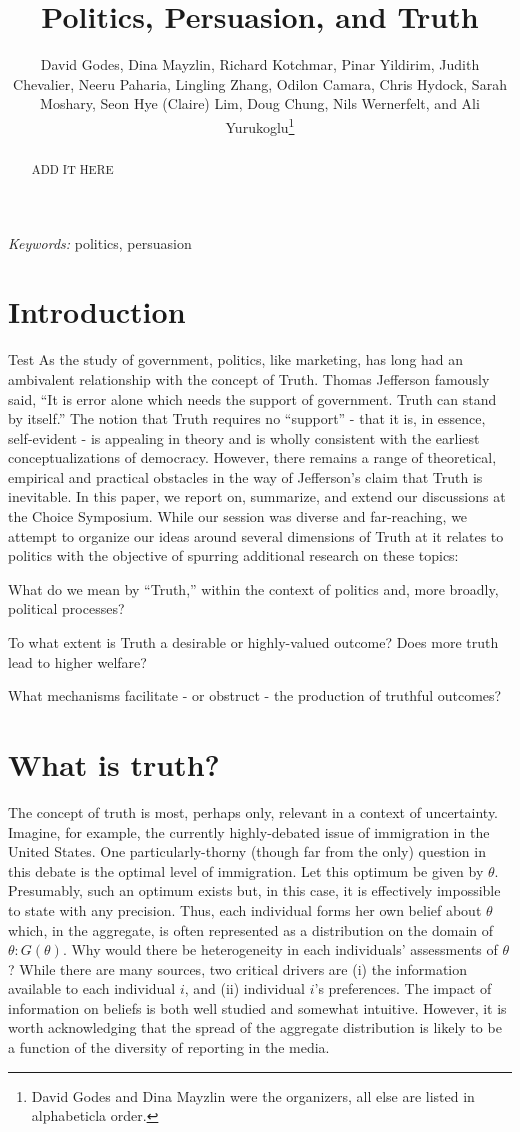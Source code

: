 \documentclass{article}
\date{}
\title{Politics, Persuasion, and Truth}
\author{David Godes, Dina Mayzlin, Richard Kotchmar, Pinar Yildirim, Judith Chevalier, Neeru Paharia, Lingling Zhang, Odilon Camara, Chris Hydock, Sarah Moshary, Seon Hye (Claire) Lim, Doug Chung, Nils Wernerfelt, and Ali Yurukoglu\footnote{David Godes and Dina Mayzlin were the organizers, all else are listed in alphabeticla order.}}
\begin{document}
\maketitle
 \begin{abstract}
ADD IT HERE 
\end{abstract}
{\it Keywords:} politics, persuasion



\begin{spacing}{2}
 \setlength{\parindent}{0.5cm}
\section{Introduction}
Test
As the study of government, politics, like marketing, has long had an ambivalent relationship with the concept of Truth. Thomas Jefferson famously said, ``It is error alone which needs the support of government. Truth can stand by itself.'' The notion that Truth requires no ``support'' - that it is, in essence, self-evident - is appealing in theory and is wholly consistent with the earliest conceptualizations of democracy. However, there remains a range of theoretical, empirical and practical obstacles in the way of Jefferson's claim that Truth is inevitable. In this paper, we report on, summarize, and extend our discussions at the Choice Symposium. While our session was diverse and far-reaching, we attempt to organize our ideas around several dimensions of Truth at it relates to politics with the objective of spurring additional research on these topics:

What do we mean by ``Truth,'' within the context of politics and, more broadly, political processes?

To what extent is Truth a desirable or highly-valued outcome? Does more truth lead to higher welfare?

What mechanisms facilitate - or obstruct - the production of truthful outcomes?


\section{What is truth?}\label{Sec: truth_def}
The concept of truth is most, perhaps only, relevant in a context of uncertainty. Imagine, for example, the currently highly-debated issue of immigration in the United States. One particularly-thorny (though far from the only) question in this debate is the optimal level of immigration. Let this optimum be given by $\theta$. Presumably, such an optimum exists but, in this case, it is effectively impossible to state with any precision. Thus, each individual forms her own belief about $\theta$ which, in the aggregate, is often represented as a distribution on the domain of $\theta: G(\theta)$.  Why would there be heterogeneity in each individuals' assessments of $\theta$? While there are many sources, two critical drivers are (i) the information available to each individual $i$, and (ii) individual $i$'s preferences. The impact of information on beliefs is both well studied and somewhat intuitive. However, it is worth acknowledging that the spread of the aggregate distribution is likely to be a function of the diversity of reporting in the media. 


\end{spacing}
\end{document}
